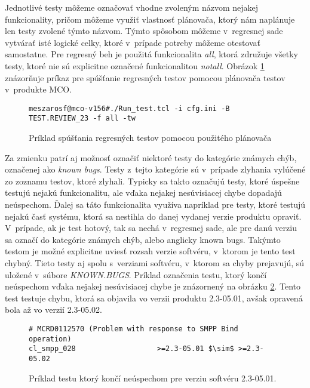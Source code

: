 Jednotlivé testy môžeme označovať vhodne zvoleným názvom nejakej 
funkcionality, pričom môžeme využiť vlastnosť plánovača, ktorý nám 
naplánuje len testy zvolené týmto názvom. Týmto spôsobom môžeme 
v~regresnej sade vytvárať isté logické celky, ktoré v~prípade potreby 
môžeme otestovať samostatne. Pre regresný beh je použitá funkcionalita 
\emph{all}, ktorá združuje všetky testy, ktoré nie sú explicitne označené 
funkcionalitou \emph{notall}. Obrázok \ref{obrazok:priklad_spustania_testov} 
znázorňuje príkaz pre spúšťanie regresných testov pomocou plánovača testov 
v~produkte MCO.

\begin{figure}[h]
\begin{lstlisting}
meszarosf@mco-v156#./Run_test.tcl -i cfg.ini -B TEST.REVIEW_23 -f all -tw
\end{lstlisting}
\caption{Príklad spúšťania regresných testov pomocou použitého plánovača}
\label{obrazok:priklad_spustania_testov}
\end{figure}

Za zmienku patrí aj možnosť označiť niektoré testy do kategórie 
známych chýb, označenej ako \emph{known bugs}. 
Testy z~tejto kategórie sú v~prípade zlyhania vylúčené zo zoznamu 
testov, ktoré zlyhali.
Typicky sa takto označujú testy, ktoré úspešne testujú nejakú 
funkcionalitu, ale vďaka nejakej nesúvisiacej chybe 
dopadajú neúspechom. Ďalej sa táto funkcionalita využíva napríklad pre 
testy, ktoré testujú nejakú časť systému, ktorá sa nestihla do danej 
vydanej verzie produktu opraviť. V~prípade, ak je test hotový, tak sa 
nechá v~regresnej sade, ale pre danú verziu sa označí do kategórie 
známych chýb, alebo anglicky known bugs.
Takýmto testom je možné explicitne uviesť rozsah verzie softvéru, 
v~ktorom je tento test chybný. Tieto testy aj spolu s~verziami softvéru, 
v~ktorom sa chyby prejavujú, sú uložené v~súbore \emph{KNOWN.BUGS}.
Príklad označenia testu, ktorý končí neúspechom vďaka nejakej 
nesúvisiacej chybe je znázornený na obrázku \ref{obrazok:known_bug}.
Tento test testuje chybu, ktorá sa objavila vo verzii produktu 2.3-05.01, 
avšak opravená bola až vo verzií 2.3-05.02. 

\begin{figure}[h]
\begin{lstlisting}[mathescape]
# MCRD0112570 (Problem with response to SMPP Bind operation)
cl_smpp_028                   >=2.3-05.01 $\sim$ >=2.3-05.02
\end{lstlisting}
\caption{Príklad testu ktorý končí neúspechom pre verziu softvéru 2.3-05.01.}
\label{obrazok:known_bug}
\end{figure}

